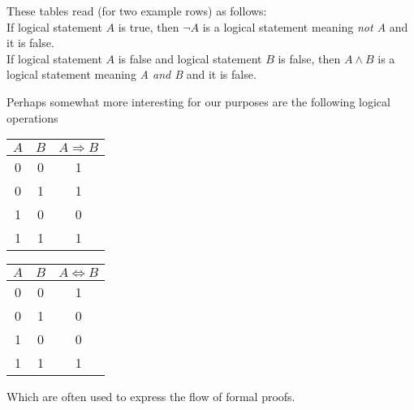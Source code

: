 {\begin{remark}
  These tables read (for two example rows) as follows: \\
  If logical statement \(A\) is true, then \(\neg A\) is a logical statement
  meaning \emph{not A} and it is false.\\
  If logical statement \(A\) is false and logical statement \(B\)
  is false, then \(A \land B\) is a logical statement meaning
  \emph{A and B} and it is false.
\end{remark}

Perhaps somewhat more interesting for our purposes are the following logical
operations

\begin{tcolorbox}[colframe=gray!80, colback=white, boxrule=0.4pt, top=4pt, bottom=4pt]
  \begin{minipage}[t]{0.48\textwidth}
    \centering
    \vspace{-10pt}
    \vspace{3pt}
    \begin{tabular}{cc|c}
      \(A\) & \(B\) & \(A \Rightarrow B\)\\
      \hline
      0 & 0 & 1 \\
      0 & 1 & 1 \\
      1 & 0 & 0 \\
      1 & 1 & 1 \\
    \end{tabular}
  \end{minipage}
  \hfill
  \begin{minipage}[t]{0.48\textwidth}
    \centering
    \vspace{-10pt}
    \vspace{3pt}
    \begin{tabular}{cc|c}
      \(A\) & \(B\) & \(A \Leftrightarrow B\)\\
      \hline
      0 & 0 & 1 \\
      0 & 1 & 0 \\
      1 & 0 & 0 \\
      1 & 1 & 1 \\
    \end{tabular}
  \end{minipage}
\end{tcolorbox}
}

Which are often used to express the flow of formal proofs.
